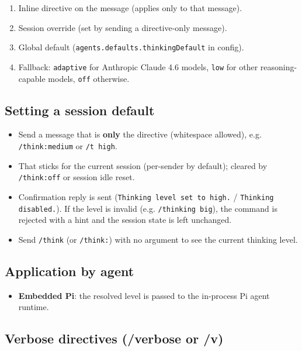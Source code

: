 \begin{enumerate}
  \item Inline directive on the message (applies only to that message).
  \item Session override (set by sending a directive-only message).
  \item Global default (\texttt{agents.defaults.thinkingDefault} in config).
  \item Fallback: \texttt{adaptive} for Anthropic Claude 4.6 models, \texttt{low} for other reasoning-capable models, \texttt{off} otherwise.
\end{enumerate}


\subsection{Setting a session default}


\begin{itemize}
  \item Send a message that is \textbf{only} the directive (whitespace allowed), e.g. \texttt{/think:medium} or \texttt{/t high}.
  \item That sticks for the current session (per-sender by default); cleared by \texttt{/think:off} or session idle reset.
  \item Confirmation reply is sent (\texttt{Thinking level set to high.} / \texttt{Thinking disabled.}). If the level is invalid (e.g. \texttt{/thinking big}), the command is rejected with a hint and the session state is left unchanged.
  \item Send \texttt{/think} (or \texttt{/think:}) with no argument to see the current thinking level.
\end{itemize}


\subsection{Application by agent}


\begin{itemize}
  \item \textbf{Embedded Pi}: the resolved level is passed to the in-process Pi agent runtime.
\end{itemize}


\subsection{Verbose directives (/verbose or /v)}


